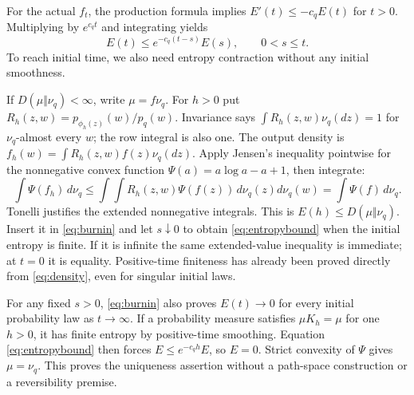 \documentclass[11pt]{article}
\begin{document}
For the actual $f_t$, the production formula implies
$E'(t)\leq-c_qE(t)$ for $t>0$. Multiplying by
$e^{c_qt}$ and integrating yields
\begin{equation}\label{eq:burnin}
 E(t)\leq e^{-c_q(t-s)}E(s),\qquad0<s\leq t.
\end{equation}
To reach initial time, we also need entropy contraction
without any initial smoothness.

If $D(\mu\Vert\nu_q)<\infty$, write $\mu=f\nu_q$.
For $h>0$ put $R_h(z,w)=p_{\phi_h(z)}(w)/p_q(w)$.
Invariance says $\int R_h(z,w)\nu_q(dz)=1$ for
$\nu_q$-almost every $w$; the row integral is also one.
The output density is
$f_h(w)=\int R_h(z,w)f(z)\nu_q(dz)$.
Apply Jensen's inequality pointwise for the nonnegative
convex function $\Psi(a)=a\log a-a+1$, then integrate:
\[
 \int\Psi(f_h)\,d\nu_q
 \leq\int\!\int R_h(z,w)\Psi(f(z))\,d\nu_q(z)d\nu_q(w)
 =\int\Psi(f)\,d\nu_q.
\]
Tonelli justifies the extended nonnegative integrals.
This is $E(h)\leq D(\mu\Vert\nu_q)$. Insert it in
\eqref{eq:burnin} and let $s\downarrow0$ to obtain
\eqref{eq:entropybound} when the initial entropy is finite.
If it is infinite the same extended-value inequality
is immediate; at $t=0$ it is equality.
Positive-time finiteness has already been proved directly
from \eqref{eq:density}, even for singular initial laws.

For any fixed $s>0$, \eqref{eq:burnin} also proves
$E(t)\to0$ for every initial probability law as
$t\to\infty$. If a probability measure satisfies
$\mu K_h=\mu$ for one $h>0$, it has finite entropy by
positive-time smoothing. Equation \eqref{eq:entropybound}
then forces $E\leq e^{-c_qh}E$, so $E=0$.
Strict convexity of $\Psi$ gives $\mu=\nu_q$.
This proves the uniqueness assertion without a path-space
construction or a reversibility premise.
\end{document}
